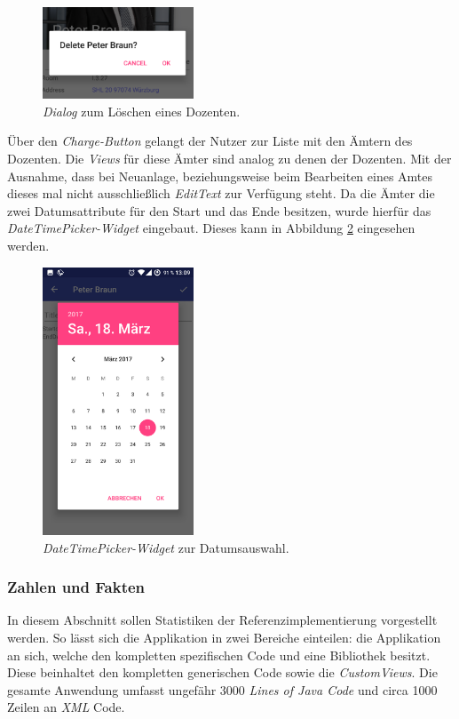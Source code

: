 \begin{figure}[H]
	\begin{center}
		\includegraphics[width=0.4\textwidth]{images/dialog.png}
		\caption{\textit{Dialog} zum Löschen eines Dozenten.}
		\label{fig:dialog}
	\end{center}
\end{figure}

Über den \textit{Charge-Button} gelangt der Nutzer zur Liste mit den Ämtern des Dozenten. Die \textit{Views} für diese Ämter sind analog zu denen der Dozenten. Mit der Ausnahme, dass bei Neuanlage, beziehungsweise beim Bearbeiten eines Amtes dieses mal nicht ausschließlich \textit{EditText} zur Verfügung steht. Da die Ämter die zwei Datumsattribute für den Start und das Ende besitzen, wurde hierfür das \textit{DateTimePicker-Widget} eingebaut. Dieses kann in Abbildung \ref{fig:date} eingesehen werden.

\begin{figure}[H]
	\begin{center}
		\includegraphics[width=0.4\textwidth]{images/date.png}
		\caption{\textit{DateTimePicker-Widget} zur Datumsauswahl.}
		\label{fig:date}
	\end{center}
\end{figure}

\subsubsection{Zahlen und Fakten}
In diesem Abschnitt sollen Statistiken der Referenzimplementierung vorgestellt werden. So lässt sich die Applikation in zwei Bereiche einteilen: die Applikation an sich, welche den kompletten spezifischen Code und eine Bibliothek besitzt. Diese beinhaltet den kompletten generischen Code sowie die \textit{CustomViews}. Die gesamte Anwendung umfasst ungefähr 3000 \textit{Lines of Java Code} und circa 1000 Zeilen an \textit{XML} Code. 

